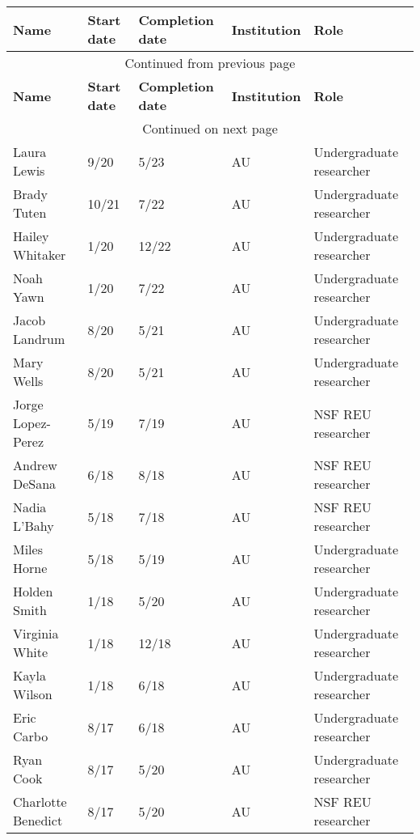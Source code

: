 {\sffamily\small
{}
\begin{longtable}[l]{ p{1.2in} p{0.5in} p{0.8in}p{0.75in} p{2in} }
    \hline
    \textbf{Name} & \textbf{Start date} & \textbf{Completion date} & \textbf{Institution} & \textbf{Role} \\
    \hline
    \endfirsthead
    \multicolumn{5}{c}{{Continued from previous page}} \\
    \hline
    \textbf{Name} & \textbf{Start date} & \textbf{Completion date} & \textbf{Institution} & \textbf{Role} \\
    \hline
    \endhead
    \hline \multicolumn{5}{c}{{Continued on next page}} \\
    \endfoot
    \hline
    \endlastfoot
    Laura Lewis & 9/20 & 5/23 & AU & Undergraduate researcher \\
    Brady Tuten & 10/21 & 7/22 & AU & Undergraduate researcher \\
    Hailey Whitaker & 1/20 & 12/22 & AU & Undergraduate researcher \\
    Noah Yawn & 1/20 & 7/22 & AU & Undergraduate researcher \\
    Jacob Landrum & 8/20 & 5/21 & AU & Undergraduate researcher \\
    Mary Wells & 8/20 & 5/21 & AU & Undergraduate researcher \\
    Jorge Lopez-Perez & 5/19 & 7/19 & AU & NSF REU researcher \\
    Andrew DeSana & 6/18 & 8/18 & AU & NSF REU researcher \\
    Nadia L'Bahy & 5/18 & 7/18 & AU & NSF REU researcher \\
    Miles Horne & 5/18 & 5/19 & AU & Undergraduate researcher \\
    Holden Smith & 1/18 & 5/20 & AU & Undergraduate researcher \\
    Virginia White & 1/18 & 12/18 & AU & Undergraduate researcher \\
    Kayla Wilson & 1/18 & 6/18 & AU & Undergraduate researcher \\
    Eric Carbo & 8/17 & 6/18 & AU & Undergraduate researcher \\
    Ryan Cook & 8/17 & 5/20 & AU & Undergraduate researcher \\
    Charlotte Benedict & 8/17 & 5/20 & AU & NSF REU researcher \\
\end{longtable}
}
